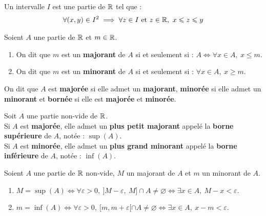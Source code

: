 \begin{definition}[Intervalle]
    Un intervalle $I$ est une partie de $\mathbb{R}$ tel que :
    \begin{align*}
        \forall (x, y) \in I^2 \implies \forall z \in I \text{ et } z \in \mathbb{R},\ x \leqslant z \leqslant y
    \end{align*}
\end{definition}

\begin{definition}
    Soient $A$ une partie de $\mathbb{R}$ et $m \in \mathbb{R}$.
    \begin{enumerate}
        \item On dit que $m$ est un \textbf{majorant} de $A$ si et seulement si : $A \iff \forall x \in A,\ x \leq m$.
        \item On dit que $m$ est un \textbf{minorant} de $A$ si et seulement si : $\forall x \in A,\ x \geq m$.
    \end{enumerate}
    On dit que $A$ est \textbf{majorée} si elle admet un \textbf{majorant}, \textbf{minorée} si elle admet un \textbf{minorant} et \textbf{bornée} si elle est \textbf{majorée} et \textbf{minorée}.
\end{definition}

\begin{theorem}
    Soit $A$ une partie non-vide de $\mathbb{R}$. \\
    Si $A$ est \textbf{majorée}, elle admet un \textbf{plus petit majorant} appelé la \textbf{borne supérieure} de $A$, notée : $\sup(A)$.
    \\
    Si $A$ est \textbf{minorée}, elle admet un \textbf{plus grand minorant} appelé la \textbf{borne inférieure} de $A$, notée : $\inf(A)$.
\end{theorem}

\begin{proposition}
    Soient $A$ une partie de $\mathbb{R}$ non-vide, $M$ un majorant de $A$ et $m$ un minorant de $A$.  
    \begin{enumerate}
        \item $M = \sup(A) \iff \forall \varepsilon > 0,\ ]M - \varepsilon,\ M] \cap A \neq \varnothing \iff \exists x \in A,\ M - x < \varepsilon$.
        \item $m = \inf(A) \iff \forall \varepsilon > 0,\ [m, m + \varepsilon[ \cap A \neq \varnothing \iff \exists x \in A,\ x - m < \varepsilon$.
    \end{enumerate}
\end{proposition}